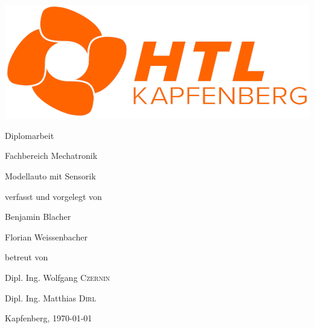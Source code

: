 \documentclass[fontsize=12pt]{article}
\begin{document}
\begin{titlepage}
	\centering
	\hspace{1.5cm}
	\includegraphics[scale=2]{htllogo.png}
	\newline
	{\huge Diplomarbeit \par}
	{\Large Fachbereich Mechatronik\par}
	\vspace{1.5cm}
	{\huge Modellauto mit Sensorik\par}
	\vspace{2cm}
	{\Large verfasst und vorgelegt von\par}
	{\huge Benjamin Blacher\par}
	{\huge Florian Weissenbacher\par}
	\vfill
	betreut von\par
	Dipl. Ing. Wolfgang \textsc{Czernin}\par
	Dipl. Ing. Matthias \textsc{Dirl}

	\vfill

	{\large Kapfenberg, \today\par}
\end{titlepage}
\newpage

\end{document}
